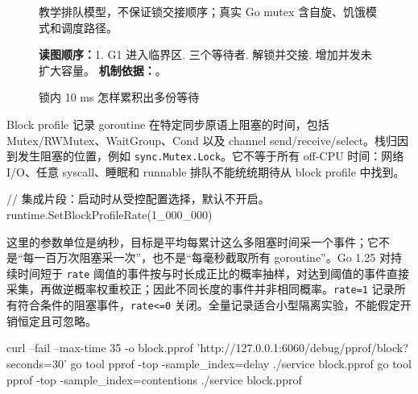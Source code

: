 \documentclass[UTF8,fontset=fandol,openany,11pt]{ctexbook}
\begin{document}
\begin{figure}[H]
\caption{锁内 10 ms 怎样累积出多份等待}\label{fig:07-lock}
\begin{minipage}{0.96\linewidth}\footnotesize 教学排队模型，不保证锁交接顺序；真实 Go mutex 含自旋、饥饿模式和调度路径。

\textbf{读图顺序：}1. G1 进入临界区. 三个等待者. 解锁并交接. 增加并发未扩大容量。
\textbf{机制依据：}\cite{tools-mprof}\cite{tools-go122}。
\end{minipage}
\end{figure}
Block profile 记录 goroutine 在特定同步原语上阻塞的时间，包括 Mutex/RWMutex、WaitGroup、Cond 以及 channel send/receive/select。栈归因到发生阻塞的位置，例如 \texttt{sync.\allowbreak{}Mutex.\allowbreak{}Lock}。它不等于所有 off-CPU 时间：网络 I/O、任意 syscall、睡眠和 runnable 排队不能统统期待从 block profile 中找到。\cite{tools-pprof}

\begin{codeblock}
// 集成片段：启动时从受控配置选择，默认不开启。
runtime.SetBlockProfileRate(1_000_000)
\end{codeblock}

这里的参数单位是纳秒，目标是平均每累计这么多阻塞时间采一个事件；它不是“每一百万次阻塞采一次”，也不是“每毫秒截取所有 goroutine”。Go 1.25 对持续时间短于 \texttt{rate} 阈值的事件按与时长成正比的概率抽样，对达到阈值的事件直接采集，再做逆概率权重校正；因此不同长度的事件并非相同概率。\texttt{rate=1} 记录所有符合条件的阻塞事件，\texttt{rate<=0} 关闭。全量记录适合小型隔离实验，不能假定开销恒定且可忽略。\cite{tools-mprof}

\begin{codeblock}
curl --fail --max-time 35 -o block.pprof   'http://127.0.0.1:6060/debug/pprof/block?seconds=30'
go tool pprof -top -sample_index=delay ./service block.pprof
go tool pprof -top -sample_index=contentions ./service block.pprof
\end{codeblock}
\end{document}
